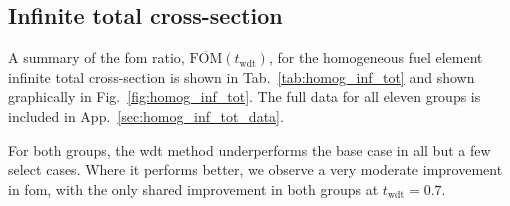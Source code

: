 \subsection{Infinite total cross-section}
\label{sec:homog_inf_total}

A summary of the \gls{fom} ratio,
$\overline{\mathrm{FOM}}(t_{\mathrm{wdt}})$, for the homogeneous fuel element
 infinite total cross-section is shown in Tab.~\ref{tab:homog_inf_tot} and shown
graphically in Fig.~\ref{fig:homog_inf_tot}. The full data for all
eleven groups is included in App.~\ref{sec:homog_inf_tot_data}.

For both groups, the \gls{wdt} method underperforms the base case in
all but a few select cases. Where it performs better, we observe a very
moderate improvement in \gls{fom}, with the only shared improvement in
both groups at $t_{\mathrm{wdt}} = 0.7$.

